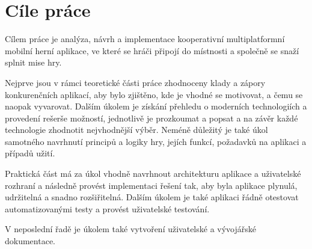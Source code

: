 \chapter{Cíle práce}
\label{chap:goals}

Cílem práce je analýza, návrh a implementace
kooperativní multiplatformní mobilní herní aplikace,
ve které se hráči připojí do místnosti a společně se snaží splnit mise hry.

Nejprve jsou v rámci teoretické části práce zhodnoceny klady a zápory
konkurenčních aplikací,
aby bylo zjištěno,
kde je vhodné se motivovat, a čemu se naopak vyvarovat.
Dalším úkolem je získání přehledu o moderních technologiích
a provedení rešerše možností, jednotlivě je prozkoumat a popsat
a na závěr každé technologie zhodnotit nejvhodnější výběr.
Neméně důležitý je také úkol samotného navrhnutí principů a logiky hry,
jejích funkcí, požadavků na aplikaci a případů užití.

Praktická část má za úkol vhodně navrhnout architekturu aplikace
a uživatelské rozhraní a následně provést implementaci řešení tak,
aby byla aplikace plynulá, udržitelná a snadno rozšiřitelná.
Dalším úkolem je také aplikaci řádně otestovat automatizovanými testy 
a provést uživatelské testování.

V neposlední řadě je úkolem také vytvoření uživatelské a vývojářské
dokumentace.
